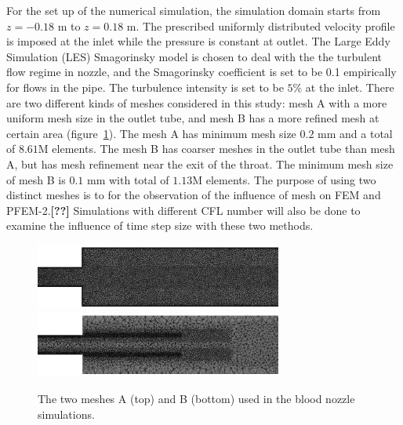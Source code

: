 For the set up of the numerical simulation, the simulation domain starts from $z=-0.18$ m to $z=0.18$ m. The prescribed uniformly distributed velocity profile is imposed at the inlet while the pressure is constant at outlet. The Large Eddy Simulation (LES) Smagorinsky model is chosen to deal with the the turbulent flow regime in nozzle, and the Smagorinsky coefficient is set to be 0.1 empirically for flows in the pipe. The turbulence intensity is set to be $5$\% at the inlet. There are two different kinds of meshes considered in this study: mesh A with a more uniform mesh size in the outlet tube, and mesh B has a more refined mesh at certain area (figure~\ref{fig:nozzlemesh}). The mesh A has minimum mesh size $0.2$ mm and a total of $8.61$M elements. The mesh B has coarser meshes in the outlet tube than mesh A, but has mesh refinement near the exit of the throat. The minimum mesh size of mesh B is $0.1$ mm with total of $1.13$M elements. The purpose of using two distinct meshes is to for the observation of the influence of mesh on FEM and PFEM-2.\textbf{[??]} Simulations with different CFL number will also be done to examine the influence of time step size with these two methods.

\begin{figure}[htbp]
    \centering
    \includegraphics[width=3.2in]{imgs/nozzle_pump/nozzle_fmesh.pdf}
    \includegraphics[width=3.2in]{imgs/nozzle_pump/nozzle_pmesh.pdf}
    \caption{The two meshes A (top) and B (bottom) used in the blood nozzle simulations.}
    \label{fig:nozzlemesh}
\end{figure}


